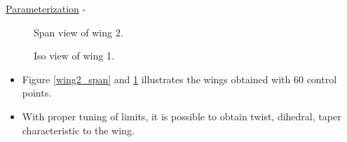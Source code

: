\begin{frame}[allowframebreaks]{\underline{Parameterization} -}
\begin{figure}
    \parbox{0.35\linewidth}
    {
    \centering
    \caption{Span view of wing 2.}
    \label{wing2_span}
    }
    \parbox{0.6\linewidth}
    {
    \centering
    \caption{Iso view of wing 1.}
    \label{wing1_iso}
    }
\end{figure}
\begin{itemize}
\item Figure \ref{wing2_span} and \ref{wing1_iso} illustrates the wings obtained with 60 control points.
\item With proper tuning of limits, it is possible to obtain twist, dihedral, taper characteristic to the wing.
\end{itemize}

\end{frame}